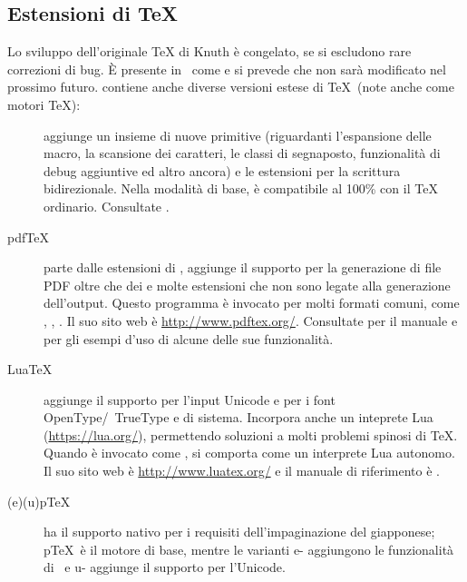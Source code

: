 \documentclass{article}
\begin{document}
\subsection{Estensioni di \protect\TeX}
\label{sec:tex-extensions}

Lo sviluppo dell'originale \TeX{} di Knuth è congelato, se si escludono
rare correzioni di bug. È presente in \TL\ come  e si prevede
che non sarà modificato nel prossimo futuro. 
\TL{} contiene anche diverse versioni estese
di \TeX\ (note anche come motori \TeX):

\begin{description}

\item [\eTeX] aggiunge un insieme di nuove primitive \label{text:etex}
(riguardanti l'espansione delle macro, la scansione dei caratteri, le
classi di segnaposto, funzionalità di debug aggiuntive ed altro ancora)
e le estensioni \TeXXeT{} per la scrittura bidirezionale. Nella modalità
di base, \eTeX{} è compatibile al 100\% con il \TeX{} ordinario.
Consultate .

\item [pdf\TeX] parte dalle estensioni di \eTeX, aggiunge il supporto per
la generazione di file PDF oltre che dei \dvi{} e molte estensioni
che non sono legate alla generazione dell'output. Questo programma è
invocato per molti formati comuni, come , ,
. Il suo sito web è \url{http://www.pdftex.org/}.
Consultate  per il manuale
e  per gli
esempi d'uso di alcune delle sue funzionalità.

\item [Lua\TeX] aggiunge il supporto per l'input Unicode e per i font
OpenType\slash\ TrueType e di sistema. Incorpora anche un inteprete Lua
(\url{https://lua.org/}), permettendo soluzioni a molti problemi spinosi
di \TeX. Quando è invocato come , si comporta come un
interprete Lua autonomo. Il suo sito web è \url{http://www.luatex.org/}
e il manuale di riferimento è .

\item [(e)(u)p\TeX] ha il supporto nativo per i requisiti dell'impaginazione
del giapponese; p\TeX\ è il motore di base, mentre le varianti e- aggiungono
le funzionalità di \eTeX\ e u- aggiunge il supporto per l'Unicode.


\end{description}
\end{document}
